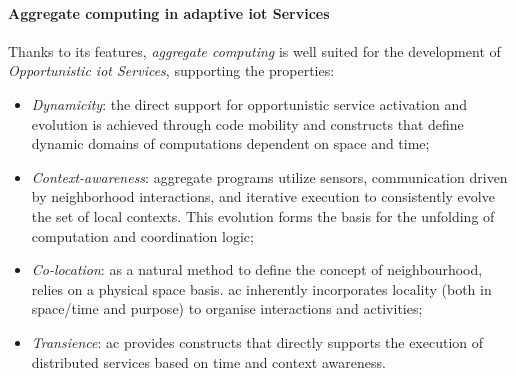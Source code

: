\paragraph{Aggregate computing in adaptive \ac{iot} Services}
Thanks to its features, \emph{aggregate computing} is well suited for the development of \emph{Opportunistic \ac{iot}
Services}, supporting the properties:
\begin{itemize}
    \item \emph{Dynamicity}: the direct support for opportunistic service activation and evolution is achieved through
        code mobility and constructs that define dynamic domains of computations dependent on space and time;
    \item \emph{Context-awareness}: aggregate programs utilize sensors, communication driven by neighborhood interactions,
        and iterative execution to consistently evolve the set of local contexts.
        This evolution forms the basis for the unfolding of computation and coordination logic;
    \item \emph{Co-location}: as a natural method to define the concept of neighbourhood, relies on a physical space basis.
        \ac{ac} inherently incorporates locality (both in space/time and purpose) to organise interactions and activities;
    \item \emph{Transience}: \ac{ac} provides constructs that directly supports the execution of distributed services
        based on time and context awareness.
\end{itemize}

